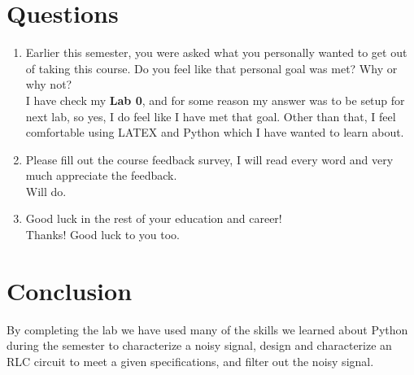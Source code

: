 \documentclass[12pt,a4paper]{article}
\begin{document}
\section{Questions}\label{sec:res}

\begin{enumerate}
    \item  
    Earlier this semester, you were asked what you personally wanted to get out of taking this course. Do you feel like that personal goal was met? Why or why not?\\
    
    I have check my \textbf{Lab 0}, and for some reason my answer was to be setup for next lab, so yes, I do feel like I have met that goal. Other than that, I feel comfortable using LATEX and Python which I have wanted to learn about.\\
    
    \item
    Please fill out the course feedback survey, I will read every word and very much appreciate the feedback.\\ 
    
    Will do.\\
    
    \item
    Good luck in the rest of your education and career!\\
    
    Thanks! Good luck to you too.

\end{enumerate}

\section{Conclusion}\label{sec:res}
    By completing the lab we have used many of the skills we learned about Python during the semester to characterize a noisy signal, design and characterize an RLC circuit to meet a given specifications, and filter out the noisy signal.
 


\end{document}
